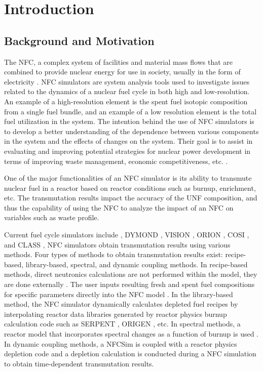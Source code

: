 \section{Introduction}



\subsection{Background and Motivation}
The \gls{NFC}, a complex system of facilities and material 
mass flows that are combined to provide nuclear energy for use 
in society, usually in the form of electricity 
\cite{yacout_modeling_2005}. 
\gls{NFC} simulators are system analysis tools used to investigate 
issues related to the dynamics of a nuclear fuel cycle in both 
high and low-resolution. 
An example of a high-resolution element is the spent fuel 
isotopic composition from a single fuel bundle, and an example 
of a low resolution element is the total fuel utilization in 
the system. 
The intention behind the use of \gls{NFC} simulators is to develop 
a better understanding of the dependence between various components 
in the system and the effects of changes on the system. 
Their goal is to assist in evaluating and improving potential 
strategies for nuclear power development in terms of improving waste 
management, economic competitiveness, etc. \cite{yacout_modeling_2005}.   

One of the major functionalities of an \gls{NFC} simulator is its 
ability to transmute nuclear fuel in a reactor based on reactor 
conditions such as burnup, enrichment, etc. 
The transmutation results impact the accuracy of the \gls{UNF} 
composition, and thus the capability of using the \gls{NFC} to 
analyze the impact of an \gls{NFC} on variables such as waste profile.  

Current fuel cycle simulators include 
\Cyclus \cite{huff_fundamental_2016},
DYMOND \cite{yacout_modeling_2005},
VISION \cite{jacobson_verifiable_2010},
ORION \cite{gregg_analysis_2012}, 
COSI \cite{coquelet-pascal_cosi6:_2015}, 
and CLASS \cite{mouginot_class_2012}, 
NFC simulators obtain transmutation results using 
various methods.  
Four types of methods to obtain transmutation 
results exist: recipe-based, library-based, spectral, and dynamic 
coupling methods. 
In recipe-based methods, direct neutronics calculations are not performed 
within the model, they are done externally \cite{yacout_vision_2006}. 
The user inputs resulting fresh and spent fuel compositions for specific 
parameters directly into the \gls{NFC} model \cite{sunny_transition_2015}. 
In the library-based method,  the \gls{NFC} simulator dynamically 
calculates depleted fuel recipes by interpolating reactor data libraries 
generated by reactor physics burnup calculation code such as SERPENT 
\cite{leppanen_serpent_2013}, \gls{ORIGEN} \cite{croff_users_1980}, etc. 
In spectral methods, a reactor model that incorporates spectral 
changes as a function of burnup is used \cite{scopatz_essential_2011}. 
In dynamic coupling methods, a \gls{NFCSim} is coupled with a reactor 
physics depletion code and a depletion calculation is conducted 
during a \gls{NFC} simulation to obtain time-dependent 
transmutation results. 

